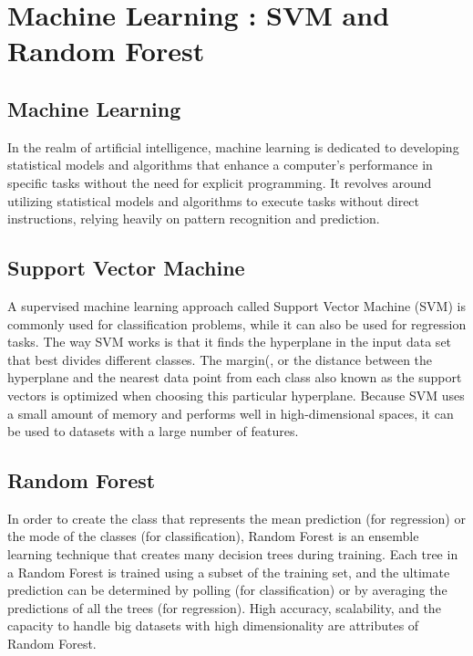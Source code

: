\section{Machine Learning : SVM and Random Forest }

\subsection{Machine Learning}

In the realm of artificial intelligence, machine learning is dedicated to developing statistical models and algorithms that enhance a computer's performance in specific tasks without the need for explicit programming. It revolves around utilizing statistical models and algorithms to execute tasks without direct instructions, relying heavily on pattern recognition and prediction.

\subsection{Support Vector Machine}

A supervised machine learning approach called Support Vector Machine (SVM) is commonly used for classification problems, while it can also be used for regression tasks. The way SVM works is that it finds the hyperplane in the input data set that best divides different classes. The margin(\cite{rankovic2023ensemble}, or the distance between the hyperplane and the nearest data point from each class also known as the support vectors is optimized when choosing this particular hyperplane. Because SVM uses a small amount of memory and performs well in high-dimensional spaces, it can be used to datasets with a large number of features.

\subsection{Random Forest}

In order to create the class that represents the mean prediction (for regression) or the mode of the classes (for classification), Random Forest is an ensemble learning technique that creates many decision trees during training. Each tree in a Random Forest is trained using a subset of the training set, and the ultimate prediction can be determined by polling (for classification) or by averaging the predictions of all the trees (for regression). High accuracy, scalability, and the capacity to handle big datasets with high dimensionality are attributes of Random Forest.






